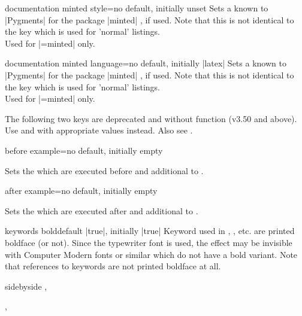 \begin{docTcbKey}{documentation minted style}{=}{no default, initially unset}
  Sets a  known to |Pygments| \cite{pygments:2013} for
  the package |minted| \cite{poore:2015a}, if used.
  Note that this is not identical to the key
   which is used for 'normal' listings.\\
  Used for |=minted| only.
\end{docTcbKey}

\begin{docTcbKey}[][doc new=2017-04-24]{documentation minted language}{=}{no default, initially |latex|}
  Sets a  known to |Pygments| \cite{pygments:2013}
  for the package |minted| \cite{poore:2015a}, if used.
  Note that this is not identical to the key
   which is used for 'normal' listings.\\
  Used for |=minted| only.
\end{docTcbKey}


\begin{marker}
The following two keys are deprecated and without function (v3.50 and above).
Use  and  with appropriate values
instead. Also see .
\end{marker}

\begin{docTcbKey}[][doc updated=2015-03-16]{before example}{=}{no default, initially empty}
\smallskip\begin{deprecated}
  Sets the  which are executed before  and 
  additional to .
\end{deprecated}
\end{docTcbKey}

\begin{docTcbKey}{after example}{=}{no default, initially empty}
\smallskip\begin{deprecated}
  Sets the  which are executed after  and 
  additional to .
\end{deprecated}
\end{docTcbKey}

\clearpage
\begin{docTcbKey}[][doc new=2017-04-25]{keywords bold}{}{default |true|, initially |true|}
  Keyword used in , , etc. are printed
  boldface (or not). Since the typewriter font is used, the effect may be
  invisible with Computer Modern fonts or similar which do not
  have a bold variant. Note that references to keywords are not printed boldface at all.
\begin{dispExample*}{sidebyside}
\LARGE
{}, 

, 
\end{dispExample*}
\end{docTcbKey}



